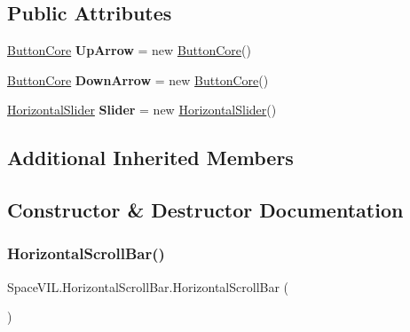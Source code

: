 \subsection*{Public Attributes}
\begin{DoxyCompactItemize}
\item 
\mbox{\label{class_space_v_i_l_1_1_horizontal_scroll_bar_ae7ac8ef1bd400e2e96ed3ac6e8d40e5d}} 
\mbox{\hyperlink{class_space_v_i_l_1_1_button_core}{Button\+Core}} {\bfseries Up\+Arrow} = new \mbox{\hyperlink{class_space_v_i_l_1_1_button_core}{Button\+Core}}()
\item 
\mbox{\label{class_space_v_i_l_1_1_horizontal_scroll_bar_ac29950a695f1facac9d6f650557a8949}} 
\mbox{\hyperlink{class_space_v_i_l_1_1_button_core}{Button\+Core}} {\bfseries Down\+Arrow} = new \mbox{\hyperlink{class_space_v_i_l_1_1_button_core}{Button\+Core}}()
\item 
\mbox{\label{class_space_v_i_l_1_1_horizontal_scroll_bar_a77b1c15d1daf829f4df1e99ab48f2bab}} 
\mbox{\hyperlink{class_space_v_i_l_1_1_horizontal_slider}{Horizontal\+Slider}} {\bfseries Slider} = new \mbox{\hyperlink{class_space_v_i_l_1_1_horizontal_slider}{Horizontal\+Slider}}()
\end{DoxyCompactItemize}
\subsection*{Additional Inherited Members}


\subsection{Constructor \& Destructor Documentation}
\mbox{\label{class_space_v_i_l_1_1_horizontal_scroll_bar_ae2deb22bc8679c96c968a955f3796806}} 
\subsubsection{\texorpdfstring{Horizontal\+Scroll\+Bar()}{HorizontalScrollBar()}}
{\footnotesize\ttfamily Space\+V\+I\+L.\+Horizontal\+Scroll\+Bar.\+Horizontal\+Scroll\+Bar (\begin{DoxyParamCaption}{ }\end{DoxyParamCaption})\hspace{0.3cm}{\ttfamily [inline]}}



